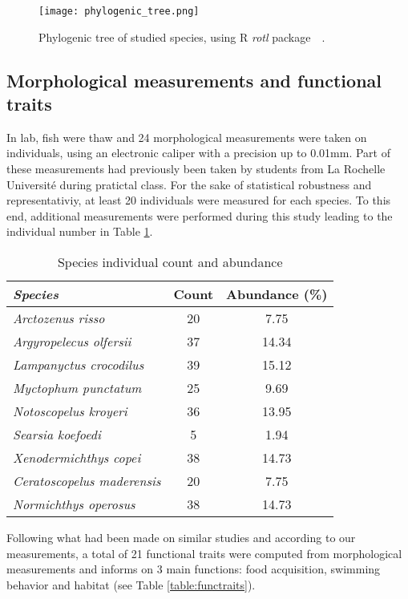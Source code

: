 \begin{figure} [!htbp]
	\begin{center}
		\texttt{[image: phylogenic\_tree.png]}
	\end{center}
	\caption[Petite légende]{Phylogenic tree of studied species, using R \emph{rotl} package~\citep{opentreeoflife2019}~.}
	\label{fig:phylotree}
\end{figure}

\subsection{Morphological measurements and functional traits}
In lab, fish were thaw and 24 morphological measurements were taken on individuals, using an electronic caliper with a precision up to 0.01mm. Part of these measurements had previously been taken by students from La Rochelle Université during pratictal class. For the sake of statistical robustness and representativiy, at least 20 individuals were measured for each species. To this end, additional measurements were performed during this study leading to the individual number in Table \ref{table:spcount}.  

\begin{table}[ht]
\centering
\caption{Species individual count and abundance}
\label{table:spcount}
\begin{tabular}{>{\itshape}lcc}
  \hline
Species & Count & Abundance (\%) \\ 
  \hline
Arctozenus risso &  20 & 7.75 \\ 
  Argyropelecus olfersii &  37 & 14.34 \\ 
  Lampanyctus crocodilus &  39 & 15.12 \\ 
  Myctophum punctatum &  25 & 9.69 \\ 
  Notoscopelus kroyeri &  36 & 13.95 \\ 
  Searsia koefoedi &   5 & 1.94 \\ 
  Xenodermichthys copei &  38 & 14.73 \\ 
  Ceratoscopelus maderensis &  20 & 7.75 \\ 
  Normichthys operosus &  38 & 14.73 \\ 
   \hline
\end{tabular}
\end{table}

Following what had been made on similar studies and according to our measurements, a total of 21 functional traits were computed from morphological measurements and informs on 3 main functions: food acquisition, swimming behavior and habitat (see Table \ref{table:functraits}).

